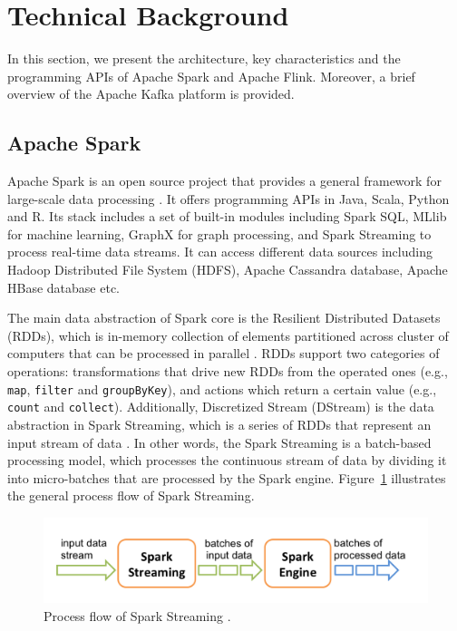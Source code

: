 \documentclass[]{article}
\begin{document}
\section{Technical Background}
\label{sec:sec2}
 In this section, we present the architecture, key characteristics and the programming APIs  of Apache Spark and Apache Flink. Moreover, a brief overview of the Apache Kafka platform is  provided.

\subsection{Apache Spark}

\par Apache Spark is an open source project that provides a general framework for large-scale data processing \cite{spark}. It offers programming APIs in Java, Scala, Python and R. Its stack includes a set of built-in modules including Spark SQL, MLlib for machine learning, GraphX for graph processing, and Spark Streaming to process real-time data streams. It can access different data sources including Hadoop Distributed File System (HDFS), Apache Cassandra database, Apache HBase database etc.

\par The main data abstraction of Spark core is the Resilient Distributed Datasets (RDDs), which is in-memory collection of elements partitioned across cluster of computers that can be processed in parallel \cite{rdd}. RDDs support two categories of operations: transformations that drive new RDDs from the operated ones (e.g., \texttt{map}, \texttt{filter} and \texttt{groupByKey}), and actions which return a certain value (e.g., \texttt{count} and \texttt{collect}). Additionally, Discretized Stream (DStream) is the data abstraction in Spark Streaming, which is a series of RDDs that represent an input stream of data \cite{spark_streaming}. In other words, the Spark Streaming is a batch-based processing model, which processes the continuous stream of data by dividing it into micro-batches that are  processed by the Spark engine. Figure~\ref{fig:spark} illustrates the general process flow of Spark Streaming. 


\begin{figure}[h]

  \centering
    \includegraphics[width=.9\textwidth, height=.3\textheight]{streaming-flow.png}
     \caption{ Process flow of Spark Streaming \cite{spark_streaming}.}
      \label{fig:spark}
\end{figure} 
\end{document}

